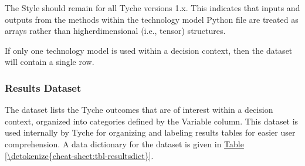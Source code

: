 \documentclass[letterpaper,10pt,english]{sphinxmanual}
\begin{document}
\sphinxAtStartPar
The Style should remain  for all Tyche versions 1.x. This indicates that inputs and outputs from the methods within the technology model Python file are treated as arrays rather than higher\sphinxhyphen{}dimensional (i.e., tensor) structures.

\sphinxAtStartPar
If only one technology model is used within a decision context, then the  dataset will contain a single row.


\subsubsection{Results Dataset}
\label{\detokenize{cheat-sheet:results-dataset}}
\sphinxAtStartPar
The  dataset lists the Tyche outcomes that are of interest within a decision context, organized into categories defined by the Variable column. This dataset is used internally by Tyche for organizing and labeling results tables for easier user comprehension. A data dictionary for the  dataset is given in \hyperref[\detokenize{cheat-sheet:tbl-resultsdict}]{Table \ref{\detokenize{cheat-sheet:tbl-resultsdict}}}.
\end{document}
